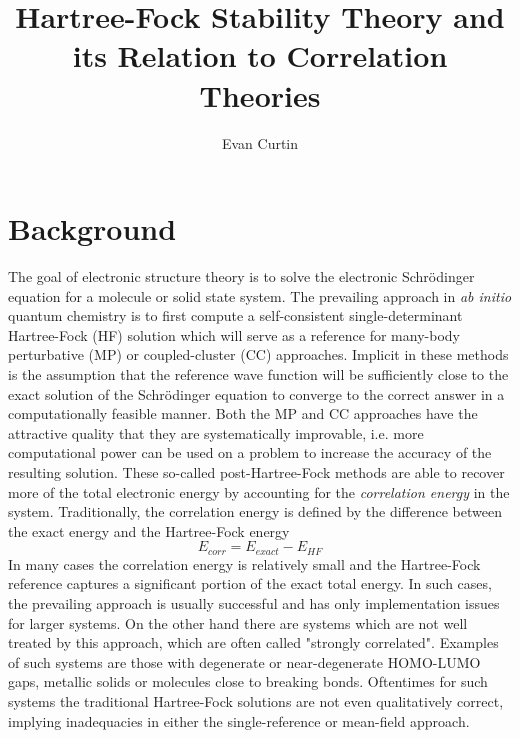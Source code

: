 \documentclass{revtex4}
\begin{document}
\title{Hartree-Fock Stability Theory and its Relation to Correlation Theories}
\author{Evan Curtin}
\maketitle


\section{Background}

    The goal of electronic structure theory is to solve the electronic Schr{\"o}dinger equation
    for a molecule or solid state system. The prevailing approach in \emph{ab initio} quantum 
    chemistry is to first compute a self-consistent single-determinant Hartree-Fock (HF) solution 
    which will serve as a reference for many-body perturbative (MP) or coupled-cluster (CC) 
    approaches.  
    Implicit in these methods is the assumption that the reference wave function will be 
    sufficiently close to the exact solution of the Schr{\"o}dinger equation to converge to the 
    correct 
    answer in a computationally feasible manner. Both the MP and CC approaches have the attractive 
    quality that they are systematically improvable, i.e. more computational power can be used on a 
    problem to increase the accuracy of the resulting solution. These so-called post-Hartree-Fock 
    methods are able to recover more of the total electronic energy by accounting for the 
    \emph{correlation energy} in the system. Traditionally, the correlation energy is defined by 
    the difference between the exact energy and the Hartree-Fock energy \cite{Shavitt2009}
    \begin{equation}\label{correlation_energy}
      E_{corr} = E_{exact} -  E_{HF}
    \end{equation}
    In many cases the correlation energy is relatively small and the Hartree-Fock reference 
    captures a significant portion of the exact total energy. In such cases, the prevailing 
    approach is usually successful and has only implementation issues for larger systems. On the 
    other hand there are systems which are not well treated by this approach, which are often 
    called "strongly correlated". Examples of such systems are those with degenerate or 
    near-degenerate HOMO-LUMO gaps, metallic solids or molecules close to breaking bonds. 
    Oftentimes for such systems the traditional Hartree-Fock solutions are not even qualitatively 
    correct, implying inadequacies in either the single-reference or mean-field approach. 
      
\end{document}
